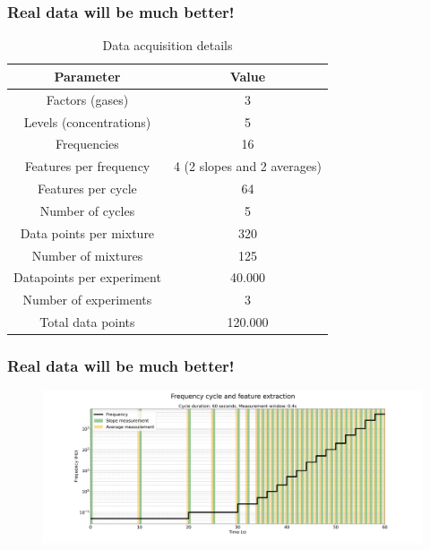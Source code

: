 \documentclass{beamer}
\begin{document}
\begin{frame}
	\frametitle{Real data will be much better!}
	
	\begin{table}[h]
		\centering
		\caption{Data acquisition details}
		\label{tab:measurements}
		\begin{tabular}{|c|c|}
			\hline
			\textbf{Parameter} & \textbf{Value} \\
			\hline
			Factors (gases) & 3 \\
			\hline
			Levels (concentrations) & 5 \\
			\hline
			Frequencies & 16 \\
			\hline
			Features per frequency & 4 (2 slopes and 2 averages) \\
			\hline
			Features per cycle & 64 \\
			\hline
			Number of cycles & 5 \\
			\hline
			Data points per mixture & 320 \\
			\hline
			Number of mixtures & 125 \\
			\hline
			Datapoints per experiment & 40.000 \\
			\hline
			Number of experiments & 3 \\
			\hline
			Total data points & 120.000 \\
			\hline
		\end{tabular}
	\end{table}

\end{frame}

\begin{frame}
	
	\frametitle{Real data will be much better!}

	\begin{figure}[!htb]
		\centering
		\includegraphics[width=1\textwidth]{../../figures/measurement-windows.png}
		\label{fig:feat-window}
	\end{figure} 
	
\end{frame}
\end{document}
